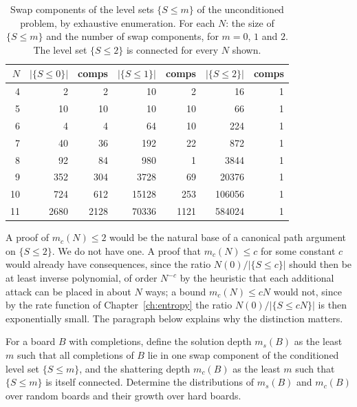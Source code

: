 \begin{table}[t]
\centering
\small
\caption{Swap components of the level sets $\{ S \le m \}$ of the unconditioned problem, by exhaustive enumeration. For each $N$: the size of $\{ S \le m \}$ and the number of swap components, for $m = 0$, $1$ and $2$. The level set $\{ S \le 2 \}$ is connected for every $N$ shown.}
\label{tab:levelsets}
\begin{tabular}{rrrrrrr}
\toprule
$N$ & $|\{S \le 0\}|$ & comps & $|\{S \le 1\}|$ & comps & $|\{S \le 2\}|$ & comps \\
\midrule
4 & 2 & 2 & 10 & 2 & 16 & 1 \\
5 & 10 & 10 & 10 & 10 & 66 & 1 \\
6 & 4 & 4 & 64 & 10 & 224 & 1 \\
7 & 40 & 36 & 192 & 22 & 872 & 1 \\
8 & 92 & 84 & 980 & 1 & 3844 & 1 \\
9 & 352 & 304 & 3728 & 69 & 20376 & 1 \\
10 & 724 & 612 & 15128 & 253 & 106056 & 1 \\
11 & 2680 & 2128 & 70336 & 1121 & 584024 & 1 \\
\bottomrule
\end{tabular}
\end{table}

A proof of $m_c(N) \le 2$ would be the natural base of a canonical path argument on $\{ S \le 2 \}$. We do not have one. A proof that $m_c(N) \le c$ for some constant $c$ would already have consequences, since the ratio $N(0) / |\{ S \le c \}|$ should then be at least inverse polynomial, of order $N^{-c}$ by the heuristic that each additional attack can be placed in about $N$ ways; a bound $m_c(N) \le cN$ would not, since by the rate function of Chapter~\ref{ch:entropy} the ratio $N(0) / |\{ S \le cN \}|$ is then exponentially small. The paragraph below explains why the distinction matters.

\begin{problem}
For a board $B$ with completions, define the solution depth $m_s(B)$ as the least $m$ such that all completions of $B$ lie in one swap component of the conditioned level set $\{ S \le m \}$, and the shattering depth $m_c(B)$ as the least $m$ such that $\{ S \le m \}$ is itself connected. Determine the distributions of $m_s(B)$ and $m_c(B)$ over random boards and their growth over hard boards.
\end{problem}

